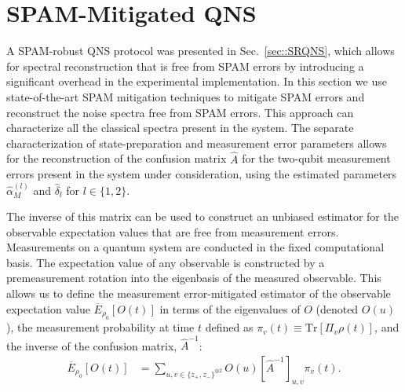 \documentclass[%
 reprint,
superscriptaddress,
 amsmath,amssymb,
 aps,
pra,
]{revtex4-2}
\begin{document}
\section{SPAM-Mitigated QNS}
\label{sec::SMQNS}
A SPAM-robust QNS protocol was presented in Sec.\, \ref{sec::SRQNS}, which allows for spectral reconstruction that is free from SPAM errors by introducing a significant overhead in the experimental implementation. In this section we use state-of-the-art SPAM mitigation techniques to mitigate SPAM errors and reconstruct the noise spectra free from SPAM errors. This approach can characterize all the classical spectra present in the system. The separate characterization of state-preparation and measurement error parameters \cite{khan2025} allows for the reconstruction of the confusion matrix $\hat{A}$ for the two-qubit measurement errors present in the system under consideration, using the estimated parameters $\hat{\alpha}^{(l)}_M$ and $\hat{\delta}_{l}$ for $l \in \{1,2\}$.

The inverse of this matrix can be used to construct an unbiased estimator for the observable expectation values that are free from measurement errors. Measurements on a quantum system are conducted in the fixed computational basis. The expectation value of any observable is constructed by a premeasurement rotation into the eigenbasis of the measured observable. This allows us to define the measurement error-mitigated estimator of the observable expectation value $\overline{E}_{\rho_0}[O(t)]$ in terms of the eigenvalues of $O$ (denoted $O(u)$), the measurement probability at time $t$ defined as $\pi_v(t)\equiv \text{Tr}[\Pi_v \rho(t)]$, and the inverse of the confusion matrix, $\hat{A}^{-1}$:
\begin{align}
    \overline{E}_{\rho_0}[O(t)]&=\sum_{u,v\in\{z_+,z_-\}^{\otimes 2}}O(u)\left[\hat{A}^{-1}\right]_{u,v}\pi_v(t).
\end{align}
\end{document}
